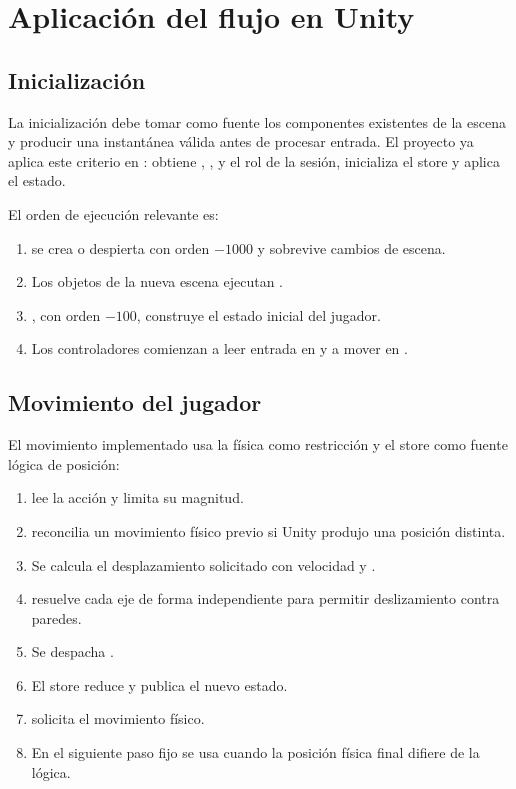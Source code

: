 \section{Aplicación del flujo en Unity}

\subsection{Inicialización}

La inicialización debe tomar como fuente los componentes existentes de la escena y producir una instantánea válida antes de procesar entrada. El proyecto ya aplica este criterio en : obtiene , ,  y el rol de la sesión, inicializa el store y aplica el estado.

El orden de ejecución relevante es:

\begin{enumerate}
  \item {} se crea o despierta con orden $-1000$ y sobrevive cambios de escena.
  \item Los objetos de la nueva escena ejecutan .
  \item {}, con orden $-100$, construye el estado inicial del jugador.
  \item Los controladores comienzan a leer entrada en  y a mover en .
\end{enumerate}

\subsection{Movimiento del jugador}

El movimiento implementado usa la física como restricción y el store como fuente lógica de posición:

\begin{enumerate}
  \item {} lee la acción  y limita su magnitud.
  \item {} reconcilia un movimiento físico previo si Unity produjo una posición distinta.
  \item Se calcula el desplazamiento solicitado con velocidad y .
  \item {} resuelve cada eje de forma independiente para permitir deslizamiento contra paredes.
  \item Se despacha .
  \item El store reduce y publica el nuevo estado.
  \item {} solicita el movimiento físico.
  \item En el siguiente paso fijo se usa  cuando la posición física final difiere de la lógica.
\end{enumerate}

